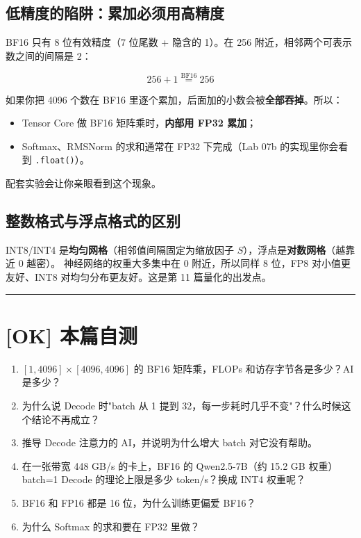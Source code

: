 \subsection{低精度的陷阱：累加必须用高精度}

BF16 只有 8 位有效精度（7 位尾数 + 隐含的 1）。在 256 附近，相邻两个可表示数之间的间隔是 2：

\[
256 + 1 \overset{\text{BF16}}{=} 256
\]

如果你把 4096 个数在 BF16 里逐个累加，后面加的小数会被\textbf{全部吞掉}。所以：
\begin{itemize}
  \item Tensor Core 做 BF16 矩阵乘时，\textbf{内部用 FP32 累加}；
  \item Softmax、RMSNorm 的求和通常在 FP32 下完成（Lab 07b 的实现里你会看到 \texttt{.float()}）。
\end{itemize}

配套实验会让你亲眼看到这个现象。

\subsection{整数格式与浮点格式的区别}

INT8/INT4 是\textbf{均匀网格}（相邻值间隔固定为缩放因子 $S$），浮点是\textbf{对数网格}（越靠近 0 越密）。
神经网络的权重大多集中在 0 附近，所以同样 8 位，FP8 对小值更友好、INT8 对均匀分布更友好。这是第 11 篇量化的出发点。

\vspace{0.8em}\hrule\vspace{0.8em}

\section{[OK] 本篇自测}

\begin{enumerate}
  \item $[1, 4096] \times [4096, 4096]$ 的 BF16 矩阵乘，FLOPs 和访存字节各是多少？AI 是多少？
  \item 为什么说 Decode 时"batch 从 1 提到 32，每一步耗时几乎不变"？什么时候这个结论不再成立？
  \item 推导 Decode 注意力的 AI，并说明为什么增大 batch 对它没有帮助。
  \item 在一张带宽 448 GB/s 的卡上，BF16 的 Qwen2.5-7B（约 15.2 GB 权重）batch=1 Decode 的理论上限是多少 token/s？换成 INT4 权重呢？
  \item BF16 和 FP16 都是 16 位，为什么训练更偏爱 BF16？
  \item 为什么 Softmax 的求和要在 FP32 里做？
\end{enumerate}

